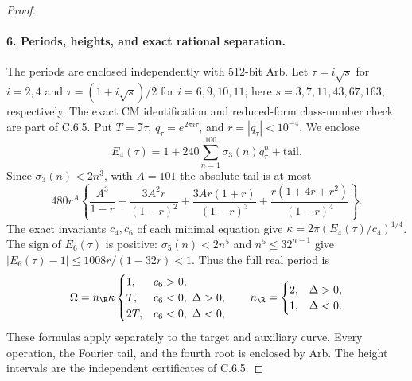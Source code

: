 \begin{proof}
\paragraph{6. Periods, heights, and exact rational separation.}
The periods are enclosed independently with 512-bit Arb. Let
$\tau=i\sqrt s$ for $i=2,4$ and
$\tau=(1+i\sqrt s)/2$ for $i=6,9,10,11$; here
$s=3,7,11,43,67,163$, respectively. The exact CM identification
and reduced-form class-number check are part of C.6.5. Put
$T=\Im\tau$, $q_\tau=e^{2\pi i\tau}$, and
$r=|q_\tau|<10^{-4}$. We enclose
\[
 E_4(\tau)=1+240\sum_{n=1}^{100}\sigma_3(n)q_\tau^n
                   +\text{tail}.
\]
Since $\sigma_3(n)<2n^3$, with $A=101$ the absolute tail is at most
\[
 480r^A\left\{
 \frac{A^3}{1-r}+\frac{3A^2r}{(1-r)^2}
 +\frac{3Ar(1+r)}{(1-r)^3}
 +\frac{r(1+4r+r^2)}{(1-r)^4}\right\}.
\]
The exact invariants $c_4,c_6$ of each minimal equation give
$\kappa=2\pi(E_4(\tau)/c_4)^{1/4}$. The sign of $E_6(\tau)$
is positive: $\sigma_5(n)<2n^5$ and
$n^5\leq32^{n-1}$ give
$|E_6(\tau)-1|\leq1008r/(1-32r)<1$.
Thus the full real period is
\[
 \Omega=n_{\R}\kappa\begin{cases}
 1,&c_6>0,\\
 T,&c_6<0,\ \Delta>0,\\
 2T,&c_6<0,\ \Delta<0,
 \end{cases}
 \qquad n_{\R}=\begin{cases}2,&\Delta>0,\\1,&\Delta<0.\end{cases}
\]
These formulas apply separately to the target and auxiliary curve.
Every operation, the Fourier tail, and the fourth root is enclosed
by Arb. The height intervals are the independent certificates
 of C.6.5.


\end{proof}
